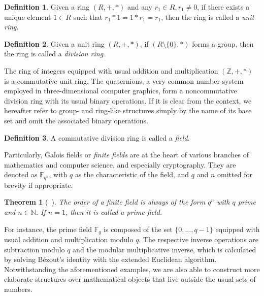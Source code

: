 \documentclass[draft, 12pt, a4paper, oneside]{memoir}
\newtheorem{theorem}{Theorem}
\theoremstyle{definition}
\newtheorem{definition}{Definition}[section]
\theoremstyle{remark}
\begin{document}
\begin{definition}
  Given a ring $(R, +, \ast)$ and any $r_{1} \in R, r_{1} \neq 0$, if there exists a unique element $1 \in R$ such that $r_{1} \ast 1 = 1 \ast r_{1} = r_{1}$, then the ring is called a \emph{unit ring}.
\end{definition}


\begin{definition}
  Given a unit ring $(R, +, \ast)$, if $(R \setminus \{0\}, \ast)$ forms a group, then the ring is called a \emph{division ring}.
\end{definition}

The ring of integers equipped with usual addition and multiplication $(\mathbb{Z}, +, \ast)$ is a commutative unit ring. The quaternions, a very common number system employed in three-dimensional computer graphics, form a noncommutative division ring with its usual binary operations. If it is clear from the context, we hereafter refer to group- and ring-like structures simply by the name of its base set and omit the associated binary operations. 

\begin{definition}
  A commutative division ring is called a \emph{field}.
\end{definition}

Particularly, Galois fields or \emph{finite fields} are at the heart of various branches of mathematics and computer science, and especially cryptography. They are denoted as $\mathbb{F}_{q^{n}}$, with $q$ as the characteristic of the field, and $q$ and $n$ omitted for brevity if appropriate.

\begin{theorem}[~\cite{}]
  The order of a finite field is always of the form $q^{n}$ with $q$ prime and $n \in \mathbb{N}$. If $n = 1$, then it is called a \emph{prime field}.
\end{theorem}

For instance, the prime field $\mathbb{F}_{q}$ is composed of the set $\{0, \dots, q - 1\}$ equipped with usual addition and multiplication modulo $q$. The respective inverse operations are subtraction modulo $q$ and the modular multiplicative inverse, which is calculated by solving Bézout's identity with the extended Euclidean algorithm. Notwithstanding the aforementioned examples, we are also able to construct more elaborate structures over mathematical objects that live outside the usual sets of numbers.
\end{document}
